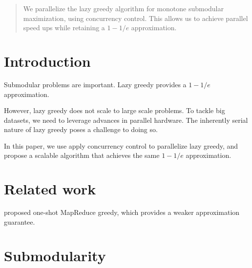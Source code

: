\documentclass{article}
\begin{document}
 


\begin{abstract} 
We parallelize the lazy greedy algorithm for monotone submodular maximization, using concurrency control.
This allows us to achieve parallel speed ups while retaining a $1-1/e$ approximation.
\end{abstract} 

\section{Introduction}
\label{sec:intro}
Submodular problems are important.
Lazy greedy provides a $1-1/e$ approximation.

However, lazy greedy does not scale to large scale problems.
To tackle big datasets, we need to leverage advances in parallel hardware.
The inherently serial nature of lazy greedy poses a challenge to doing so.

In this paper, we use apply concurrency control to parallelize lazy greedy, and propose a scalable algorithm that achieves the same $1-1/e$ approximation.

\section{Related work}
\label{sec:relatedwork}
\cite{badan14} proposed one-shot MapReduce greedy, which provides a weaker approximation guarantee.

\section{Submodularity}
\label{sec:submodular}
\end{document}
